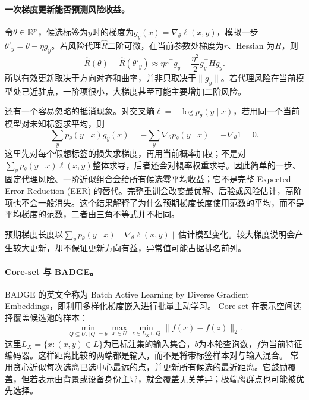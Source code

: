 \paragraph{一次梯度更新能否预测风险收益。}
令$\theta\in\mathbb{R}^p$，候选标签为$y$时的梯度为$g_y(x)=\nabla_\theta\ell(x,y)$，模拟一步$\theta'_y=\theta-\eta g_y$。若风险代理$\widehat R$二阶可微，在当前参数处梯度为$r$、Hessian 为$H$，则
\begin{equation}
 \widehat R(\theta)-\widehat R(\theta'_y)
 \approx\eta r^\top g_y-\frac{\eta^2}{2}g_y^\top Hg_y.
\end{equation}
所以有效更新取决于方向对齐和曲率，并非只取决于$\|g_y\|$。若代理风险在当前模型处已近驻点，一阶项很小，大梯度甚至可能主要增加二阶风险。

还有一个容易忽略的抵消现象。对交叉熵$\ell=-\log p_\theta(y\mid x)$，若用同一个当前模型对未知标签求平均，则
\begin{equation}
 \sum_yp_\theta(y\mid x)g_y(x)
 =-\sum_y\nabla_\theta p_\theta(y\mid x)
 =-\nabla_\theta1=0.
\end{equation}
这里先对每个假想标签的损失求梯度，再用当前概率加权；不是对$\sum_yp_\theta(y\mid x)\ell(x,y)$整体求导，后者还会对概率权重求导。因此简单的一步、固定代理风险、一阶近似组合会给所有候选零平均收益；它不是完整 Expected Error Reduction (EER) 的替代。完整重训会改变最优解、后验或风险估计，高阶项也不会一般消失。这个结果解释了为什么预期梯度长度使用范数的平均，而不是平均梯度的范数，二者由三角不等式并不相同。

预期梯度长度以$\sum_yp_\theta(y\mid x)\|\nabla_\theta\ell(x,y)\|$估计模型变化。较大梯度说明会产生较大更新，却不保证更新方向有益，异常值可能占据排名前列。

\paragraph{Core-set 与 BADGE。}
BADGE 的英文全称为 Batch Active Learning by Diverse Gradient Embeddings，即利用多样化梯度嵌入进行批量主动学习。
Core-set 在表示空间选择覆盖候选池的样本\cite{sener2018coreset}：
\begin{equation}
 \min_{Q\subseteq U:\,|Q|=b}\max_{x\in U}\min_{z\in L_X\cup Q}
 \|f(x)-f(z)\|_2.
\end{equation}
这里$L_X=\{x:(x,y)\in L\}$为已标注集的输入集合，$b$为本轮查询数，$f$为当前特征编码器。这样距离比较的两端都是输入，而不是将带标签样本对与输入混合。
常用贪心近似每次选离已选中心最远的点，并更新所有候选的最近距离。它鼓励覆盖，但若表示由背景或设备身份主导，就会覆盖无关差异；极端离群点也可能被优先选择。


